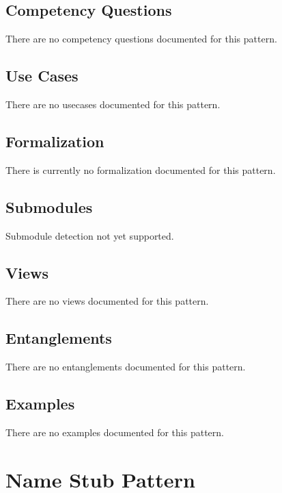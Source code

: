 \subsection{Competency Questions}
\label{ssec:cqs}
There are no competency questions documented for this pattern.

\subsection{Use Cases}
\label{ssec:use-cases}
There are no usecases documented for this pattern.
\subsection{Formalization}
\label{ssec:formalization}
There is currently no formalization documented for this pattern.

\subsection{Submodules}
\label{ssec:submodules}
Submodule detection not yet supported.

\subsection{Views}
\label{ssec:views}
There are no views documented for this pattern.


\subsection{Entanglements}
\label{ssec:entanglements}
There are no entanglements documented for this pattern.

\subsection{Examples}
\label{ssec:examples}
There are no examples documented for this pattern.


\section{Name Stub Pattern}
\label{sec:name-stub-pattern}
